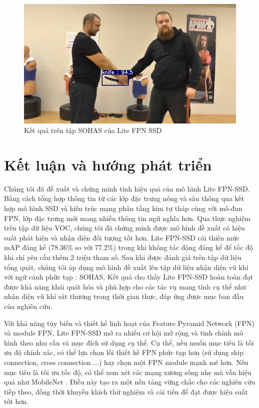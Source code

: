 \documentclass[a4paper]{article}
\begin{document}
\begin{figure}[h]
\begin{multicols}{2}
		\includegraphics[width=1.\linewidth]{fig/SOHAS_711}
	\end{multicols}
	\caption{Kết quả trên tập SOHAS của Lite FPN SSD}
	\label{onSOHAS}
\end{figure}

\section{\textbf{Kết luận và hướng phát triển}}

Chúng tôi đã đề xuất và chứng minh tính hiệu quả của mô hình Lite FPN-SSD. Bằng cách tổng hợp thông tin từ các lớp đặc trưng nông và sâu thông qua kết hợp mô hình SSD và kiến trúc mạng phân tầng kim tự tháp cùng với mô-đun FPN, lớp đặc trưng mới mang nhiều thông tin ngữ nghĩa hơn. Qua thực nghiệm trên tập dữ liệu VOC, chúng tôi đã chứng minh được mô hình đề xuất có hiệu suất phát hiện và nhận diện đối tượng tốt hơn. Lite FPN-SSD cải thiện mức mAP đáng kể (78.36\% so với 77.2\%) trong khi không tác động đáng kể để tốc độ khi chỉ yêu cầu thêm 2 triệu tham số. Sau khi được đánh giá trên tập dữ liệu tổng quát, chúng tôi áp dụng mô hình đề xuất lên tập dữ liệu nhận diện vũ khí với ngữ cảnh phức tạp : SOHAS. Kết quả cho thấy Lite FPN-SSD hoàn toàn đạt được khả năng khái quát hóa và phù hợp cho các tác vụ mang tính cụ thể như nhận diện vũ khí sát thương trong thời gian thực, đáp ứng được mục ban đầu của nghiên cứu.

Với khả năng tùy biến và thiết kế linh hoạt của Feature Pyramid Network (FPN) và module FPN, Lite FPN-SSD mở ra nhiều cơ hội mở rộng và tinh chỉnh mô hình theo nhu cầu và mục đích sử dụng cụ thể. Cụ thể, nếu muốn mục tiêu là tối ưu độ chính xác, có thể lựa chọn lối thiết kế FPN phức tạp hơn (sử dụng skip connection, cross connection ...) hay chọn một FPN module mạnh mẽ hơn. Nếu mục tiêu là tối ưu tốc độ, có thể xem xét các mạng xương sống nhẹ mà vẫn hiệu quả như MobileNet \cite{mobilenets}. Điều này tạo ra một nền tảng vững chắc cho các nghiên cứu tiếp theo, đồng thời khuyến khích thử nghiệm và cải tiến để đạt được hiệu suất tốt hơn.

\renewcommand\refname{Tài liệu tham khảo}



\end{document}
